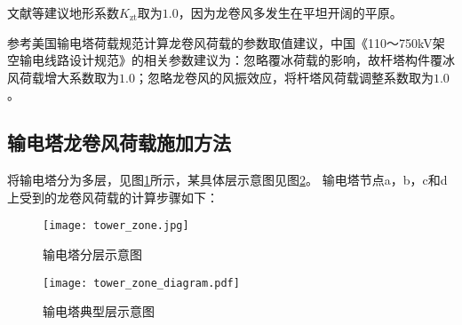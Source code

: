 文献\cite{hamada2010finite}\cite{hamada2011behaviour}\cite{altalmas2014finite}等建议地形系数$K_\mathrm{zt}$取为$1.0$，因为龙卷风多发生在平坦开阔的平原。


参考美国输电塔荷载规范计算龙卷风荷载的参数取值建议，中国《110～750kV架空输电线路设计规范》的相关参数建议为：忽略覆冰荷载的影响，故杆塔构件覆冰风荷载增大系数取为$1.0$；忽略龙卷风的风振效应，将杆塔风荷载调整系数取为$1.0$。

\subsection{输电塔龙卷风荷载施加方法}
将输电塔分为多层，见图\ref{fig:tower-zone}所示，某具体层示意图见图\ref{fig:tower-zone-diagram}。
输电塔节点a，b，c和d上受到的龙卷风荷载的计算步骤如下：
\begin{figure}[!htbp]
\centering
\texttt{[image: tower\_zone.jpg]}
\caption{输电塔分层示意图}\label{fig:tower-zone}
\end{figure}

\begin{figure}[!htbp]
\centering
\texttt{[image: tower\_zone\_diagram.pdf]}
\caption{输电塔典型层示意图}\label{fig:tower-zone-diagram}
\end{figure}


